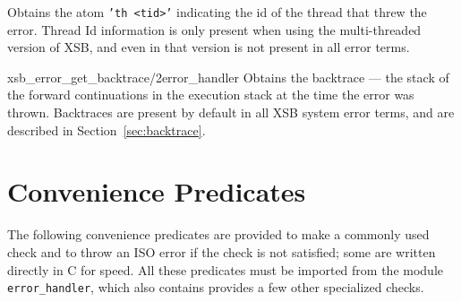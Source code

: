 \begin{description}
%
Obtains the atom {\tt 'th <tid>'} indicating the id of the thread that
threw the error.  Thread Id information is only present when using the
multi-threaded version of XSB, and even in that version is not present
in all error terms.  

{xsb\_error\_get\_backtrace/2}{error\_handler} 
%
Obtains the backtrace --- the stack of the forward continuations in
the execution stack at the time the error was thrown.  Backtraces are
present by default in all XSB system error terms, and are described in
Section~\ref{sec:backtrace}.

%

\end{description}

\section{Convenience Predicates}

The following convenience predicates are provided to make a commonly
used check and to throw an ISO error if the check is not satisfied;
some are written directly in C for speed.  All these predicates must
be imported from the module {\tt error\_handler}, which also contains
provides a few other specialized checks.

